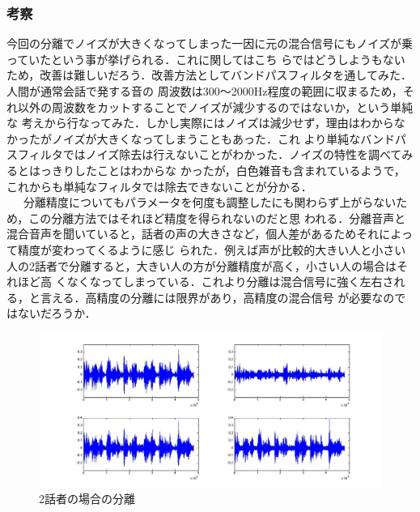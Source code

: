 \documentclass[a4j]{jarticle}
\begin{document}
\subsubsection{考察}
今回の分離でノイズが大きくなってしまった一因に元の混合信号にもノイズが乗っていたという事が挙げられる．これに関してはこち
らではどうしようもないため，改善は難しいだろう．改善方法としてバンドパスフィルタを通してみた．人間が通常会話で発する音の
周波数は300〜2000Hz程度の範囲に収まるため，それ以外の周波数をカットすることでノイズが減少するのではないか，という単純な
考えから行なってみた．しかし実際にはノイズは減少せず，理由はわからなかったがノイズが大きくなってしまうこともあった．これ
より単純なバンドパスフィルタではノイズ除去は行えないことがわかった．ノイズの特性を調べてみるとはっきりしたことはわからな
かったが，白色雑音も含まれているようで，これからも単純なフィルタでは除去できないことが分かる．\\\ \ \ 
分離精度についてもパラメータを何度も調整したにも関わらず上がらないため，この分離方法ではそれほど精度を得られないのだと思
われる．分離音声と混合音声を聞いていると，話者の声の大きさなど，個人差があるためそれによって精度が変わってくるように感じ
られた．例えば声が比較的大きい人と小さい人の2話者で分離すると，大きい人の方が分離精度が高く，小さい人の場合はそれほど高
くなくなってしまっている．これより分離は混合信号に強く左右される，と言える．高精度の分離には限界があり，高精度の混合信号
が必要なのではないだろうか．

\begin{figure}[htb]
 \begin{center}
  \includegraphics[width=13cm, clip, bb=0 0 1123 506]{pic/bunri2.jpg}
  \caption{2話者の場合の分離}
  \label{bunri2}
 \end{center}
\end{figure}
\end{document}
